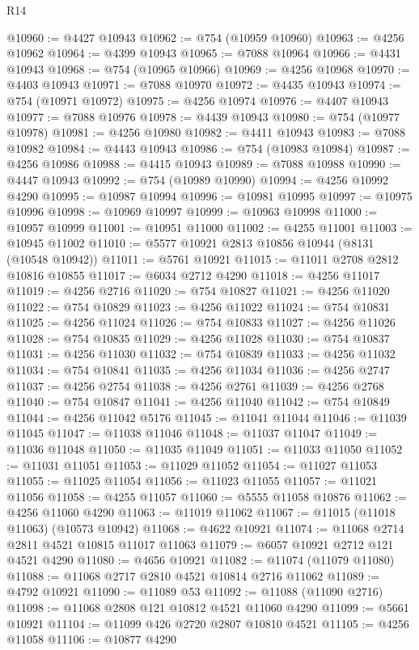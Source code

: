\begin{lexlean}{R14}
\begin{coremodule}
@10960 := @4427 @10943
@10962 := @754 (@10959 @10960)
@10963 := @4256 @10962
@10964 := @4399 @10943
@10965 := @7088 @10964
@10966 := @4431 @10943
@10968 := @754 (@10965 @10966)
@10969 := @4256 @10968
@10970 := @4403 @10943
@10971 := @7088 @10970
@10972 := @4435 @10943
@10974 := @754 (@10971 @10972)
@10975 := @4256 @10974
@10976 := @4407 @10943
@10977 := @7088 @10976
@10978 := @4439 @10943
@10980 := @754 (@10977 @10978)
@10981 := @4256 @10980
@10982 := @4411 @10943
@10983 := @7088 @10982
@10984 := @4443 @10943
@10986 := @754 (@10983 @10984)
@10987 := @4256 @10986
@10988 := @4415 @10943
@10989 := @7088 @10988
@10990 := @4447 @10943
@10992 := @754 (@10989 @10990)
@10994 := @4256 @10992 @4290
@10995 := @10987 @10994
@10996 := @10981 @10995
@10997 := @10975 @10996
@10998 := @10969 @10997
@10999 := @10963 @10998
@11000 := @10957 @10999
@11001 := @10951 @11000
@11002 := @4255 @11001
@11003 := @10945 @11002
@11010 := @5577 @10921 @2813 @10856 @10944 (@8131 (@10548 @10942))
@11011 := @5761 @10921
@11015 := @11011 @2708 @2812 @10816 @10855
@11017 := @6034 @2712 @4290
@11018 := @4256 @11017
@11019 := @4256 @2716
@11020 := @754 @10827
@11021 := @4256 @11020
@11022 := @754 @10829
@11023 := @4256 @11022
@11024 := @754 @10831
@11025 := @4256 @11024
@11026 := @754 @10833
@11027 := @4256 @11026
@11028 := @754 @10835
@11029 := @4256 @11028
@11030 := @754 @10837
@11031 := @4256 @11030
@11032 := @754 @10839
@11033 := @4256 @11032
@11034 := @754 @10841
@11035 := @4256 @11034
@11036 := @4256 @2747
@11037 := @4256 @2754
@11038 := @4256 @2761
@11039 := @4256 @2768
@11040 := @754 @10847
@11041 := @4256 @11040
@11042 := @754 @10849
@11044 := @4256 @11042 @5176
@11045 := @11041 @11044
@11046 := @11039 @11045
@11047 := @11038 @11046
@11048 := @11037 @11047
@11049 := @11036 @11048
@11050 := @11035 @11049
@11051 := @11033 @11050
@11052 := @11031 @11051
@11053 := @11029 @11052
@11054 := @11027 @11053
@11055 := @11025 @11054
@11056 := @11023 @11055
@11057 := @11021 @11056
@11058 := @4255 @11057
@11060 := @5555 @11058 @10876
@11062 := @4256 @11060 @4290
@11063 := @11019 @11062
@11067 := @11015 (@11018 @11063) (@10573 @10942)
@11068 := @4622 @10921
@11074 := @11068 @2714 @2811 @4521 @10815 @11017 @11063
@11079 := @6057 @10921 @2712 @121 @4521 @4290
@11080 := @4656 @10921
@11082 := @11074 (@11079 @11080)
@11088 := @11068 @2717 @2810 @4521 @10814 @2716 @11062
@11089 := @4792 @10921
@11090 := @11089 @53
@11092 := @11088 (@11090 @2716)
@11098 := @11068 @2808 @121 @10812 @4521 @11060 @4290
@11099 := @5661 @10921
@11104 := @11099 @426 @2720 @2807 @10810 @4521
@11105 := @4256 @11058
@11106 := @10877 @4290

\end{coremodule}
\end{lexlean}
